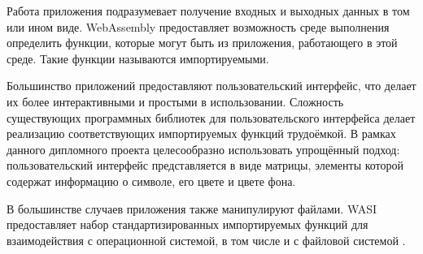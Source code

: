 Работа приложения подразумевает получение входных и выходных данных в том или ином виде.
WebAssembly предоставляет возможность среде выполнения определить функции, которые могут быть из приложения, работающего в этой среде.
Такие функции называются импортируемыми.

Большинство приложений предоставляют пользовательский интерфейс, что делает их более интерактивными и простыми в использовании.
Сложность существующих программных библиотек для пользовательского интерфейса делает реализацию соответствующих импортируемых функций трудоёмкой.
В рамках данного дипломного проекта целесообразно использовать упрощённый подход: пользовательский интерфейс представляется в виде матрицы, элементы которой содержат информацию о символе, его цвете и цвете фона.

В большинстве случаев приложения также манипулируют файлами.
WASI предоставляет набор стандартизированных импортируемых функций для взаимодействия с операционной системой, в том числе и с файловой системой \cite{WASI}.
